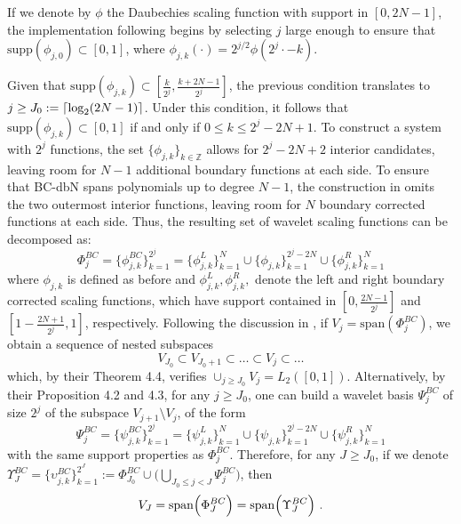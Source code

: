 \documentclass{article}
\newcommand{\1}{\mathds{1}}
\DeclarePairedDelimiter{\ceil}{\lceil}{\rceil}
\theoremstyle{plain}
\theoremstyle{definition}
\theoremstyle{remark}
\begin{document}
If we denote by $\phi$ the Daubechies scaling function  with support in $[0, 2N-1]$, the implementation following \cite{holm2020orthonormal} begins by selecting $j$ large enough to ensure that $\text{supp}(\phi_{j,0}) \subset [0,1]$, where $\phi_{j,k}(\cdot) = 2^{j/2}\phi(2^j \cdot - k)$. 

Given that $\text{supp}(\phi_{j,k}) \subset [\frac{k}{2^j}, \frac{k+2N-1}{2^j}]$, the previous condition translates to $j \geq J_0 := \ceil{\log_2(2N-1)}$. Under this condition, it follows that $\text{supp}(\phi_{j,k}) \subset [0,1]$ if and only if $0 \leq k \leq 2^j - 2N + 1$. To construct a system with $2^j$ functions, the set  $\{\phi_{j,k}\}_{k\in \mathbb Z}$ allows for $2^j - 2N + 2$ interior candidates, leaving room for $N-1$ additional boundary functions at each side. To ensure that BC-dbN spans polynomials up to degree $N-1$, the construction in \cite{holm2020orthonormal} omits the two outermost interior functions, leaving room for $N$ boundary corrected functions at each side. Thus, the resulting set of wavelet scaling functions can be decomposed as:
\begin{equation}
  \Phi_j^{BC} = \{ \phi_{j,k}^{BC} \}_{k=1}^{2^j} = \{ \phi_{j,k}^L \}_{k=1}^{N} \cup \{ \phi_{j,k} \}_{k=1}^{2^j - 2N} \cup \{ \phi_{j,k}^R \}_{k=1}^{N}  
\end{equation}
where $\phi_{j,k}$ is defined as before and $\phi_{j,k}^L,\phi_{j,k}^R,$ denote  the left and right boundary corrected scaling functions, which have support contained in $[0,\tfrac{2N-1}{2^j}]$ and $[1-\tfrac{2N+1}{2^j},1]$, respectively. Following the discussion in \cite[pp.~72-73]{cohen1993wavelets}, if $V_j = \mathrm{span}(\Phi_j^{BC})$, we obtain a sequence of nested subspaces 
\begin{equation}
    V_{J_0} \subset V_{J_0+1} \subset \ldots \subset V_{j} \subset \ldots
\end{equation} 
which, by their Theorem 4.4, verifies $\cup_{j\geq J_0} V_j = L_2([0,1])$. Alternatively, by their Proposition 4.2 and 4.3, for any $j\geq J_0$, one can build a wavelet basis $\Psi_j^{BC}$ of size $2^j$ of the subspace $V_{j+1}\setminus V_j$, of the form 
\begin{equation}
    \Psi_j^{BC} = \{ \psi_{j,k}^{BC} \}_{k=1}^{2^j} = \{ \psi_{j,k}^L \}_{k=1}^{N} \cup \{ \psi_{j,k} \}_{k=1}^{2^j - 2N} \cup \{ \psi_{j,k}^R \}_{k=1}^{N}
\end{equation}
with the same support properties as $\Phi_j^{BC}$. Therefore, for any $J\geq J_0$, if we denote $\Upsilon_J^{BC}=  \{ \upsilon_{j,k}^{BC} \}_{k=1}^{2^J}:= \Phi_{J_0}^{BC} \cup \bigl(\bigcup_{J_0\leq j < J} \Psi_j^{BC}\bigr)$,  then  
\begin{equation}
    V_J = \mathrm{span} \Bigl(\Phi_J^{BC} \Bigr) = \mathrm{span}\Bigl(\Upsilon_J^{BC} \Bigr)\ .
\end{equation}
\end{document}
